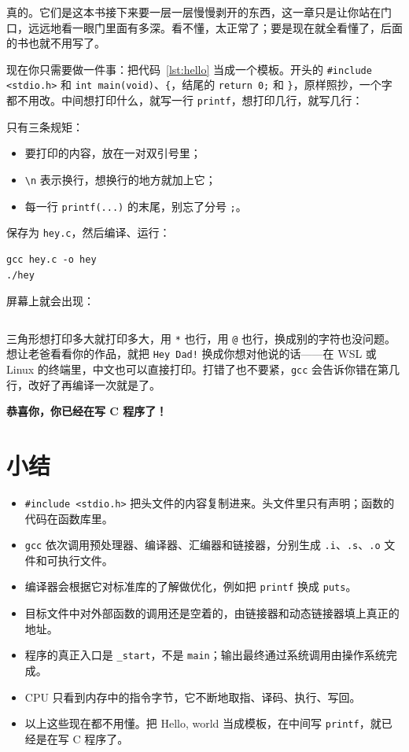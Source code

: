 真的。它们是这本书接下来要一层一层慢慢剥开的东西，这一章只是让你站在门口，远远地看一眼门里面有多深。看不懂，太正常了；要是现在就全看懂了，后面的书也就不用写了。

现在你只需要做一件事：把代码~\ref{lst:hello} 当成一个模板。开头的 \texttt{\#include <stdio.h>} 和 \texttt{int main(void)}、\texttt{\{}，结尾的 \texttt{return 0;} 和 \texttt{\}}，原样照抄，一个字都不用改。中间想打印什么，就写一行 \texttt{printf}，想打印几行，就写几行：


只有三条规矩：
\begin{itemize}
  \item 要打印的内容，放在一对双引号里；
  \item \texttt{\textbackslash n} 表示换行，想换行的地方就加上它；
  \item 每一行 \texttt{printf(...)} 的末尾，别忘了分号 \texttt{;}。
\end{itemize}

保存为 \texttt{hey.c}，然后编译、运行：
\begin{verbatim}
gcc hey.c -o hey
./hey
\end{verbatim}
屏幕上就会出现：
\inputminted[linenos=false]{text}{code/ch01/hey.out}

三角形想打印多大就打印多大，用 \texttt{*} 也行，用 \texttt{@} 也行，换成别的字符也没问题。想让老爸看看你的作品，就把 \texttt{Hey Dad!} 换成你想对他说的话——在 WSL 或 Linux 的终端里，中文也可以直接打印。打错了也不要紧，\texttt{gcc} 会告诉你错在第几行，改好了再编译一次就是了。

\bigskip
\begin{center}
  {\Large\bfseries 恭喜你，你已经在写 C 程序了！}
\end{center}
\bigskip

\section{小结}

\begin{itemize}
  \item \texttt{\#include <stdio.h>} 把头文件的内容复制进来。头文件里只有声明；函数的代码在函数库里。
  \item \texttt{gcc} 依次调用预处理器、编译器、汇编器和链接器，分别生成 \texttt{.i}、\texttt{.s}、\texttt{.o} 文件和可执行文件。
  \item 编译器会根据它对标准库的了解做优化，例如把 \texttt{printf} 换成 \texttt{puts}。
  \item 目标文件中对外部函数的调用还是空着的，由链接器和动态链接器填上真正的地址。
  \item 程序的真正入口是 \texttt{\_start}，不是 \texttt{main}；输出最终通过系统调用由操作系统完成。
  \item CPU 只看到内存中的指令字节，它不断地取指、译码、执行、写回。
  \item 以上这些现在都不用懂。把 Hello, world 当成模板，在中间写 \texttt{printf}，就已经是在写 C 程序了。
\end{itemize}

